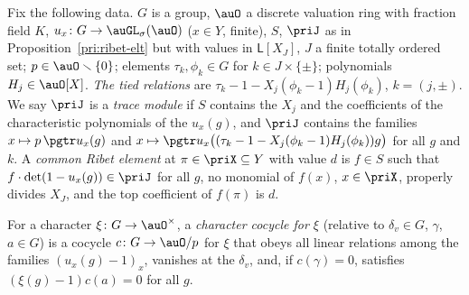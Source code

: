\documentclass[10pt]{amsart}
\theoremstyle{definition}
\theoremstyle{remark}
\begin{document}
Fix the following data. $G$ is a group, $\auO$ a discrete valuation ring with fraction field $K$,
$u_x\colon G\to\auGL_\sigma(\auO)$ ($x\in Y$, finite), $S$, $\priJ$ as in
Proposition~\ref{pri:ribet-elt} but with values in $\mathsf L[X_J]$, $J$ a finite totally ordered
set; $p\in\auO\smallsetminus\{0\}$; elements $\tau_k,\phi_k\in G$ for $k\in J\times\{\pm\}$;
polynomials $H_j\in\auO[X]$. \emph{The tied relations} are $\tau_k-1-X_j(\phi_k-1)H_j(\phi_k)$,
$k=(j,\pm)$. We say $\priJ$ is a \emph{trace module} if $S$ contains the $X_j$ and the coefficients
of the characteristic polynomials of the $u_x(g)$, and $\priJ$ contains the families $x\mapsto
p\,\pgtr u_x(g)$ and $x\mapsto\pgtr u_x\bigl((\tau_k-1-X_j(\phi_k-1)H_j(\phi_k))g\bigr)$ for all $g$
and $k$. A \emph{common Ribet element} at $\pi\in\priX\subseteq Y$ with value $d$ is $f\in S$ such
that $f\cdot\det(1-u_x(g))\in\priJ$ for all $g$, no monomial of $f(x)$, $x\in\priX$, properly divides
$X_J$, and the top coefficient of $f(\pi)$ is $d$.

For a character $\xi\colon G\to\auO^\times$, a \emph{character cocycle for $\xi$} (relative to
$\delta_v\in G$, $\gamma$, $a\in G$) is a cocycle $c\colon G\to\auO/p$ for $\xi$ that obeys all
linear relations among the families $(u_x(g)-1)_x$, vanishes at the $\delta_v$, and, if $c(\gamma)
=0$, satisfies $(\xi(g)-1)c(a)=0$ for all $g$.
\end{document}
